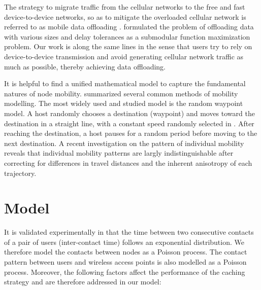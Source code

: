 \documentclass{sig-alternate}
\begin{document}
The strategy to migrate traffic from the cellular networks to the free and fast device-to-device networks, so as to mitigate the overloaded cellular network is referred to as mobile data offloading \cite{li2011multiple}\cite{han2011mobile}. \cite{li2011multiple} formulated the problem of offloading data with various sizes and delay tolerances as a submodular function maximization problem. Our work is along the same lines in the sense that users try to rely on device-to-device transmission and avoid generating cellular network traffic as much as possible, thereby achieving data offloading.

It is helpful to find a unified mathematical model to capture the fundamental natures of node mobility. \cite{zheng2004recent} summarized several common methods of mobility modelling. The most widely used and studied model is the random waypoint model. A host randomly chooses a destination (waypoint) and moves toward the destination in a straight line, with a constant speed randomly selected in . After reaching the destination, a host pauses for a random period before moving to the next destination. A recent investigation on the pattern of individual mobility \cite{gonzalez2008understanding} reveals that individual mobility patterns are largly indistinguishable after correcting for differences in travel distances and the inherent anisotropy of each trajectory. 

\section{Model}
It is validated experimentally in \cite{gao2009multicasting}\cite{conan2007characterizing} that the time between two consecutive contacts of a pair of users (inter-contact time) follows an exponential distribution. We therefore model the contacts between nodes as a Poisson process. The contact pattern between users and wireless access points is also modelled as a Poisson process. Moreover, the following factors affect the performance of the caching strategy and are therefore addressed in our model:
\end{document}
